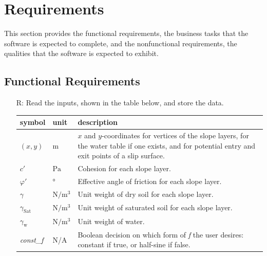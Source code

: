 \documentclass[12pt]{article}
\renewcommand{\arraystretch}{1}
\newcounter{reqnum} %
\newcounter{tablenum} %
\begin{document}
\section{Requirements} \label{sec_Reqs}

This section provides the functional requirements, the business tasks
that the software is expected to complete, and the nonfunctional
requirements, the qualities that the software is expected to exhibit.

\subsection{Functional Requirements}

\noindent \begin{itemize}


\item[R\refstepcounter{reqnum}\thereqnum \label{R_Inputs}:] Read the
  inputs, shown in the table below, and store the data.
  \begin{table}[!h]
  \renewcommand{\arraystretch}{1.5}
  \noindent \begin{tabularx}{1.0\textwidth}{l l X} \toprule \textbf{symbol} &
    {tablenum}  \label{Table:Inputs}
    \textbf{unit} & \textbf{description}\\ \midrule
    $\left(x,y\right)$ & $\text{m}$ & $x$ and $y$-coordinates for vertices
    of the slope layers, for the water table if one exists, and for potential 
    entry and exit points of a slip surface.\\
    $c'$ & $\si{\pascal}$ & Cohesion for each slope layer. \\
    $\varphi'$ & \si{\degree} & Effective angle of friction for each
    slope layer. \\
    $\gamma$ & $\si{\newton\per\meter\cubed}$ & Unit weight of dry
    soil for each slope layer. \\
    $\gamma_{\text{Sat}}$ & $\si{\newton\per\meter\cubed}$ & Unit
    weight of saturated soil for each slope layer. \\
    $\gamma_{\text{w}}$ & $\si{\newton\per\meter\cubed}$ & Unit
    weight of water. \\
    \textit{const\_f} & N/A & Boolean decision on which form of \textit{f} 
    the user desires: constant if true, or half-sine if false.\\ \bottomrule
\end{tabularx}
\end{table}


\end{itemize}
\end{document}
